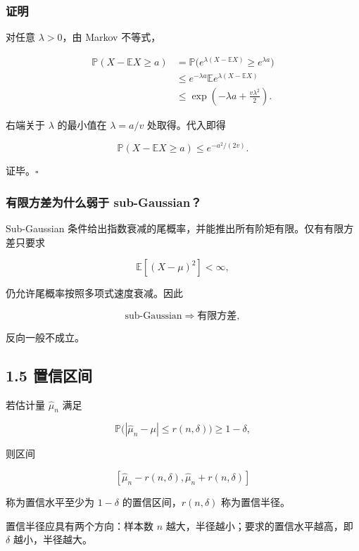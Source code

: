 \documentclass[
  11pt,
  a4paper,
]{ctexart}
\begin{document}
\subsubsection{证明}\label{ux8bc1ux660e-3}

对任意 \(\lambda>0\)，由 Markov 不等式，

\[
\begin{aligned}
\mathbb P(X-\mathbb EX\ge a)
&=\mathbb P\big(e^{\lambda(X-\mathbb EX)}\ge e^{\lambda a}\big)\\
&\le e^{-\lambda a}\mathbb E e^{\lambda(X-\mathbb EX)}\\
&\le\exp\left(-\lambda a+\frac{v\lambda^2}{2}\right).
\end{aligned}
\]

右端关于 \(\lambda\) 的最小值在 \(\lambda=a/v\) 处取得。代入即得

\[
\mathbb P(X-\mathbb EX\ge a)
\le e^{-a^2/(2v)}.
\]

证毕。\(\square\)

\subsubsection{有限方差为什么弱于
sub-Gaussian？}\label{ux6709ux9650ux65b9ux5deeux4e3aux4ec0ux4e48ux5f31ux4e8e-sub-gaussian}

Sub-Gaussian
条件给出指数衰减的尾概率，并能推出所有阶矩有限。仅有有限方差只要求

\[
\mathbb E[(X-\mu)^2]<\infty,
\]

仍允许尾概率按照多项式速度衰减。因此

\[
\text{sub-Gaussian}\Longrightarrow\text{有限方差},
\]

反向一般不成立。

\subsection{1.5 置信区间}\label{ux7f6eux4fe1ux533aux95f4}

若估计量 \(\widehat\mu_n\) 满足

\[
\mathbb P\big(|\widehat\mu_n-\mu|\le r(n,\delta)\big)
\ge1-\delta,
\]

则区间

\[
[\widehat\mu_n-r(n,\delta),\widehat\mu_n+r(n,\delta)]
\]

称为置信水平至少为 \(1-\delta\) 的置信区间，\(r(n,\delta)\)
称为置信半径。

置信半径应具有两个方向：样本数 \(n\)
越大，半径越小；要求的置信水平越高，即 \(\delta\) 越小，半径越大。
\end{document}
